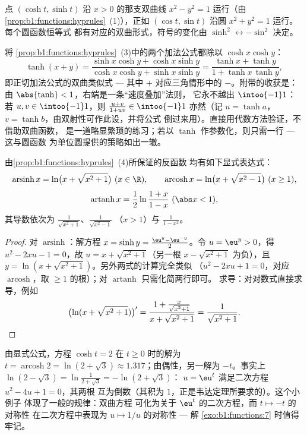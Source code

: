 \begin{remark}[为什么叫“双曲”？]
点 $(\cosh t, \sinh t)$ 沿 $x > 0$ 的那支双曲线
$x^2 - y^2 = 1$ 运行（由
\cref{prop:b1:functions:hyprules}~(1)），正如 $(\cos t, \sin
t)$ 沿圆 $x^2 + y^2 = 1$ 运行。每个圆函数恒等式
都有对应的双曲形式，符号的变化由
$\sinh^2 \leftrightarrow -\sin^2$ 决定。
\end{remark}

\begin{example}\label{ex:b1:functions:tanhadd}
将
\cref{prop:b1:functions:hyprules}~(3)中的两个加法公式都除以 $\cosh x\cosh y$：
\[
\tanh(x + y)
= \frac{\sinh x\cosh y + \cosh x\sinh y}
{\cosh x\cosh y + \sinh x\sinh y}
= \frac{\tanh x + \tanh y}{1 + \tanh x\,\tanh y} ,
\]
即正切加法公式的双曲类似式 --- 其中
$+$ 对应三角情形中的 $-$。附带的收获是：由 $\abs{\tanh}
< 1$，右端是一条“速度叠加”法则，
它永不越出 $\intoo{-1}1$：若 $u, v \in \intoo{-1}1$，则
$\frac{u + v}{1 + uv} \in \intoo{-1}1$ 亦然（记 $u = \tanh
a$，$v = \tanh b$，由双射性可作此设，并将公式
倒过来用）。直接用代数方法验证，不借助双曲函数，
是一道略显繁琐的练习；若以
$\tanh$ 作参数化，则只需一行 --- 这与圆函数
为单位圆提供的策略如出一辙。
\end{example}

\begin{proposition}[反双曲函数]\label{prop:b1:functions:invhyp}
由\cref{prop:b1:functions:hyprules}~(4)所保证的反函数
均有如下显式表达式：
\[
\operatorname{arsinh} x = \ln\bigl(x + \sqrt{x^2 + 1}\bigr)
\ (x \in \R),
\qquad
\operatorname{arcosh} x = \ln\bigl(x + \sqrt{x^2 - 1}\bigr)
\ (x \geq 1),
\]
\[
\operatorname{artanh} x = \frac 12 \ln\frac{1 + x}{1 - x}
\ (\abs x < 1),
\]
其导数依次为 $\frac{1}{\sqrt{x^2+1}}$、$\frac{1}{\sqrt{x^2-1}}$
（$x > 1$）与 $\frac{1}{1 - x^2}$。
\end{proposition}

\begin{proof}
对 $\operatorname{arsinh}$：解方程 $x = \sinh y = \frac{\eu^y -
\eu^{-y}}{2}$。令 $u = \eu^y > 0$，得 $u^2 - 2xu - 1 = 0$，故 $u = x
+ \sqrt{x^2 + 1}$（另一根 $x - \sqrt{x^2+1}$ 为负），且 $y =
\ln(x + \sqrt{x^2+1})$。另外两式的计算完全类似
（$u^2 - 2xu + 1 = 0$，对应 $\operatorname{arcosh}$，取
$\geq 1$ 的根）；对 $\operatorname{artanh}$ 只需化简两行即可。
求导：对对数式直接求导，例如
\[
\bigl(\ln(x + \sqrt{x^2+1})\bigr)'
= \frac{1 + \frac{x}{\sqrt{x^2+1}}}{x + \sqrt{x^2+1}}
= \frac{1}{\sqrt{x^2 + 1}} . \qedhere
\]
\end{proof}

\begin{example}[显式公式的应用]\label{ex:b1:functions:arcoshtwo}
由显式公式，方程 $\cosh t = 2$ 在 $t \geq 0$ 时的解为
$t = \operatorname{arcosh} 2 = \ln(2 + \sqrt3) \approx
1.317$；由偶性，另一解为 $-t$。事实上
$\ln(2 - \sqrt3) = \ln\frac1{2 + \sqrt3} = -\ln(2 + \sqrt3)$：
$u = \eu^t$ 满足二次方程 $u^2 - 4u + 1 = 0$，其两根
互为倒数（其积为 $1$，正是韦达定理所要求的）。这个小例子
体现了一般的规律：双曲方程
可化为关于 $\eu^t$ 的二次方程，而 $t \mapsto -t$ 的对称性
在二次方程中表现为 $u \mapsto 1/u$ 的对称性 ---
解 \cref{exo:b1:functions:7} 时值得牢记。
\end{example}


